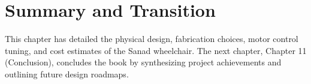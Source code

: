 \section{Summary and Transition}
This chapter has detailed the physical design, fabrication choices, motor control tuning, and cost estimates of the Sanad wheelchair. The next chapter, Chapter 11 (Conclusion), concludes the book by synthesizing project achievements and outlining future design roadmaps.